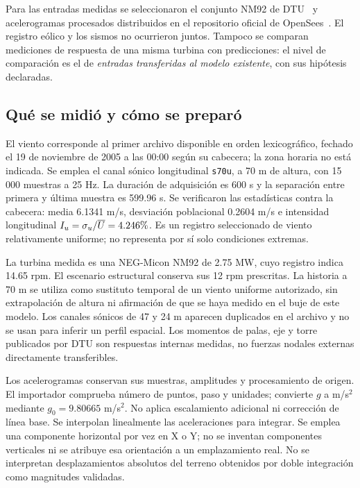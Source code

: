 \documentclass[11pt,a4paper]{article}
\newcommand{\pct}{\text{\char37}}
\begin{document}
Para las entradas medidas se seleccionaron el conjunto NM92 de DTU~\cite{dtu2021inputs} y acelerogramas procesados distribuidos en el repositorio oficial de OpenSees~\cite{openseesinputs}. El registro eólico y los sismos no ocurrieron juntos. Tampoco se comparan mediciones de respuesta de una misma turbina con predicciones: el nivel de comparación es el de \emph{entradas transferidas al modelo existente}, con sus hipótesis declaradas.

\subsection{Qué se midió y cómo se preparó}
El viento corresponde al primer archivo disponible en orden lexicográfico, fechado el 19 de noviembre de 2005 a las 00:00 según su cabecera; la zona horaria no está indicada. Se emplea el canal sónico longitudinal \texttt{s70u}, a 70 m de altura, con 15\,000 muestras a 25 Hz. La duración de adquisición es 600 s y la separación entre primera y última muestra es 599.96 s. Se verificaron las estadísticas contra la cabecera: media 6.1341 m/s, desviación poblacional 0.2604 m/s e intensidad longitudinal $I_u=\sigma_u/\overline U=4.246\pct$. Es un registro seleccionado de viento relativamente uniforme; no representa por sí solo condiciones extremas.

La turbina medida es una NEG-Micon NM92 de 2.75 MW, cuyo registro indica 14.65 rpm. El escenario estructural conserva sus 12 rpm prescritas. La historia a 70 m se utiliza como sustituto temporal de un viento uniforme autorizado, sin extrapolación de altura ni afirmación de que se haya medido en el buje de este modelo. Los canales sónicos de 47 y 24 m aparecen duplicados en el archivo y no se usan para inferir un perfil espacial. Los momentos de palas, eje y torre publicados por DTU son respuestas internas medidas, no fuerzas nodales externas directamente transferibles.

Los acelerogramas conservan sus muestras, amplitudes y procesamiento de origen. El importador comprueba número de puntos, paso y unidades; convierte $g$ a m/s$^2$ mediante $g_0=9.80665$ m/s$^2$. No aplica escalamiento adicional ni corrección de línea base. Se interpolan linealmente las aceleraciones para integrar. Se emplea una componente horizontal por vez en X o Y; no se inventan componentes verticales ni se atribuye esa orientación a un emplazamiento real. No se interpretan desplazamientos absolutos del terreno obtenidos por doble integración como magnitudes validadas.
\end{document}
